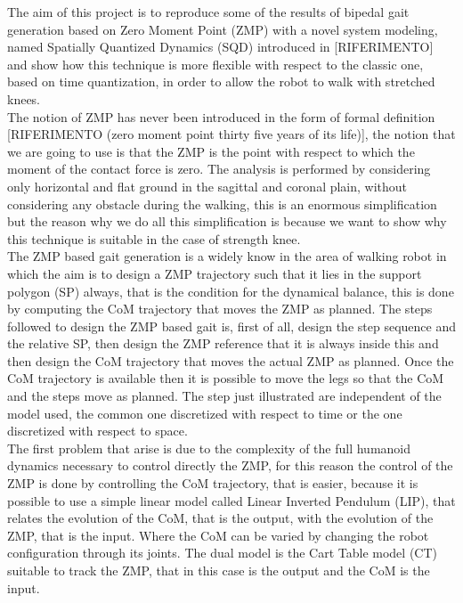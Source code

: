 \documentclass[a4paper]{article}
\begin{document}
The aim of this project is to reproduce some of the results of bipedal gait generation based on Zero Moment Point (ZMP) with a novel system modeling, named Spatially Quantized Dynamics (SQD) introduced in [RIFERIMENTO] and show how this technique is more flexible with respect to the classic one, based on time quantization, in order to allow the robot to walk with stretched knees.\\
The notion of ZMP has never been introduced in the form of formal definition [RIFERIMENTO (zero moment point thirty five years of its life)], the notion that we are going to use is that the ZMP is the point with respect to which the moment of the contact force is zero.
The analysis is performed by considering only horizontal and flat ground in the sagittal and coronal plain, without considering any obstacle during the walking, this is an enormous simplification but the reason why we do all this simplification is because we want to show why this technique is suitable in the case of strength knee.\\
The ZMP based gait generation is a widely know in the area of walking robot in which the aim is to design a ZMP trajectory such that it lies in the support polygon (SP) always, that is the condition for the dynamical balance, this is done by computing the CoM trajectory that moves the ZMP as planned. The steps followed to design the ZMP based gait is, first of all, design the step sequence and the relative SP, then design the ZMP reference that it is always inside this and then design the CoM trajectory that moves the actual ZMP as planned. Once the CoM trajectory is available then it is possible to move the legs so that the CoM and the steps move as planned. The step just illustrated are independent of the model used, the common one discretized with respect to time or the one discretized with respect to space.\\
The first problem that arise is due to the complexity of the full humanoid dynamics necessary to control directly the ZMP, for this reason the control of the ZMP is done by controlling the CoM trajectory, that is easier, because it is possible to use a simple linear model called Linear Inverted Pendulum (LIP), that relates the evolution of the CoM, that is the output, with the evolution of the ZMP, that is the input. Where the CoM can be varied by changing the robot configuration through its joints. The dual model is the Cart Table model (CT) suitable to track the ZMP, that in this case is the output and the CoM is the input.\\
\end{document}
